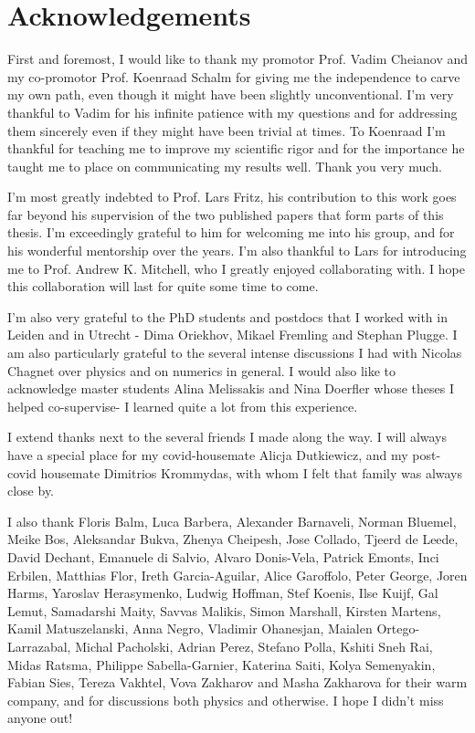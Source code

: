 \newpage
\thispagestyle{empty}

\chapter*{Acknowledgements}
\label{Acknowledgements}

First and foremost, I would like to thank my promotor Prof. Vadim Cheianov and my co-promotor Prof. Koenraad Schalm for giving me the independence to carve my own path, even though it might have been slightly unconventional. I'm very thankful to Vadim for his infinite patience with my questions and for addressing them sincerely even if they might have been trivial at times. To Koenraad I'm thankful for teaching me to improve my scientific rigor and for the importance he taught me to place on communicating my results well. Thank you very much. 
\par
I'm most greatly indebted to Prof. Lars Fritz, his contribution to this work goes far beyond his supervision of the two published papers that form parts of this thesis. I'm exceedingly grateful to him for welcoming me into his group, and for his wonderful mentorship over the years. I'm also thankful to Lars for introducing me to Prof. Andrew K. Mitchell, who I greatly enjoyed collaborating with. I hope this collaboration will last for quite some time to come. 
\par
I'm also very grateful to the PhD students and postdocs that I worked with in Leiden and in Utrecht - Dima Oriekhov, Mikael Fremling and Stephan Plugge. I am also particularly grateful to the several intense discussions I had with Nicolas Chagnet over physics and on numerics in general. I would also like to acknowledge master students Alina Melissakis and Nina Doerfler whose theses I helped co-supervise- I learned quite a lot from this experience.
\par
I extend thanks next to the several friends I made along the way. I will always have a special place for my covid-housemate Alicja Dutkiewicz, and my post-covid housemate Dimitrios Krommydas, with whom I felt that family was always close by. 
\par
I also thank Floris Balm, Luca Barbera, Alexander Barnaveli, Norman Bluemel,  Meike Bos, Aleksandar Bukva, Zhenya Cheipesh, Jose Collado, Tjeerd de Leede, David Dechant, Emanuele di Salvio, Alvaro Donis-Vela, Patrick Emonts, Inci Erbilen, Matthias Flor, Ireth Garcia-Aguilar, Alice Garoffolo, Peter George, Joren Harms, Yaroslav Herasymenko, Ludwig Hoffman, Stef Koenis, Ilse Kuijf, Gal Lemut, Samadarshi Maity, Savvas Malikis, Simon Marshall, Kirsten Martens, Kamil Matuszelanski, Anna Negro, Vladimir Ohanesjan, Maialen Ortego-Larrazabal, Michal Pacholski, Adrian Perez, Stefano Polla, Kshiti Sneh Rai, Midas Ratsma, Philippe Sabella-Garnier, Katerina Saiti, Kolya Semenyakin, Fabian Sies, Tereza Vakhtel, Vova Zakharov and Masha Zakharova for their warm company, and for discussions both physics and otherwise. I hope I didn't miss anyone out! 

